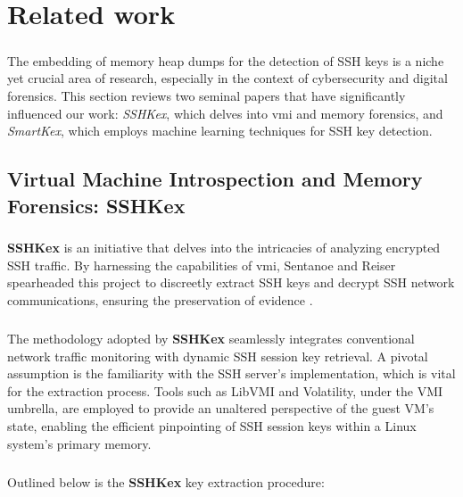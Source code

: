 \chapter{Related work}\label{chap:related_work}

\paragraph{}The embedding of memory heap dumps for the detection of SSH keys is a niche yet crucial area of research, especially in the context of cybersecurity and digital forensics. This section reviews two seminal papers that have significantly influenced our work: \textit{SSHKex}, which delves into \acrfull{vmi} and memory forensics, and \textit{SmartKex}, which employs machine learning techniques for SSH key detection.

\section{Virtual Machine Introspection and Memory Forensics: SSHKex}

    \paragraph{}\textbf{SSHKex} is an initiative that delves into the intricacies of analyzing encrypted SSH traffic. By harnessing the capabilities of \acrshort{vmi}, Sentanoe and Reiser spearheaded this project to discreetly extract SSH keys and decrypt SSH network communications, ensuring the preservation of evidence \cite{sentanoe_sshkex_2022}.

    \paragraph{}The methodology adopted by \textbf{SSHKex} seamlessly integrates conventional network traffic monitoring with dynamic SSH session key retrieval. A pivotal assumption is the familiarity with the SSH server's implementation, which is vital for the extraction process. Tools such as LibVMI and Volatility, under the VMI umbrella, are employed to provide an unaltered perspective of the guest VM's state, enabling the efficient pinpointing of SSH session keys within a Linux system's primary memory.


    \paragraph{}Outlined below is the \textbf{SSHKex} key extraction procedure:

